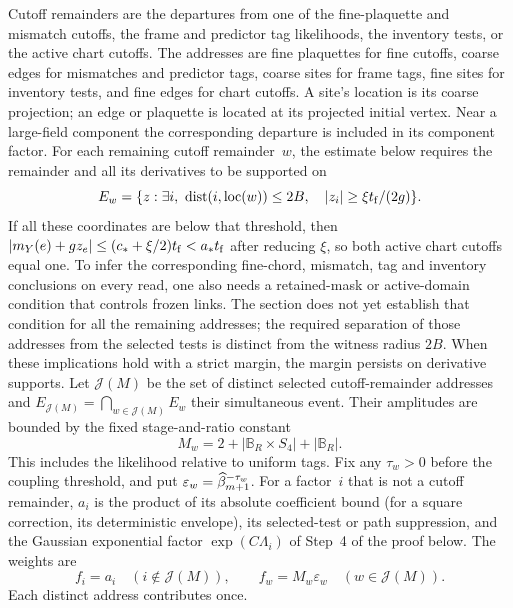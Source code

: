 Cutoff remainders are the departures from one of the fine-plaquette and mismatch cutoffs, the frame and predictor tag likelihoods, the inventory tests, or the active chart cutoffs. The addresses are fine plaquettes for fine cutoffs, coarse edges for mismatches and predictor tags, coarse sites for frame tags, fine sites for inventory tests, and fine edges for chart cutoffs. A site's location is its coarse projection; an edge or plaquette is located at its projected initial vertex. Near a large-field component the corresponding departure is included in its component factor. For each remaining cutoff remainder~$w$, the estimate below requires the remainder and all its derivatives to be supported on
\begin{equation*}
E_w=\{z:\exists i,\ \operatorname{dist}(i,\operatorname{loc}(w))\le2B,
\quad |z_i|\ge\xi t_{\rm f}/(2g)\}.
\end{equation*}
If all these coordinates are below that threshold, then $|m_Y(e)+gz_e|\le(c_*+\xi/2)t_{\rm f}<a_*t_{\rm f}$ after reducing $\xi$, so both active chart cutoffs equal one. To infer the corresponding fine-chord, mismatch, tag and inventory conclusions on every read, one also needs a retained-mask or active-domain condition that controls frozen links. The section does not yet establish that condition for all the remaining addresses; the required separation of those addresses from the selected tests is distinct from the witness radius $2B$. When these implications hold with a strict margin, the margin persists on derivative supports. Let $\mathcal J(M)$ be the set of distinct selected cutoff-remainder addresses and $E_{\mathcal J(M)}=\bigcap_{w\in\mathcal J(M)}E_w$ their simultaneous event. Their amplitudes are bounded by the fixed stage-and-ratio constant
\begin{equation*}
M_w=2+|\mathbb B_R\times S_4|+|\mathbb B_R|.
\end{equation*}
This includes the likelihood relative to uniform tags. Fix any $\tau_w>0$ before the coupling threshold, and put $\varepsilon_w=\widehat{\beta}_{m+1}^{-\tau_w}$. For a factor~$i$ that is not a cutoff remainder, $a_i$ is the product of its absolute coefficient bound (for a square correction, its deterministic envelope), its selected-test or path suppression, and the Gaussian exponential factor $\exp(C\Lambda_i)$ of Step~4 of the proof below. The weights are
\begin{equation*}
f_i=a_i\quad(i\notin\mathcal J(M)),\qquad
f_w=M_w\varepsilon_w\quad(w\in\mathcal J(M)).
\end{equation*}
Each distinct address contributes once.

